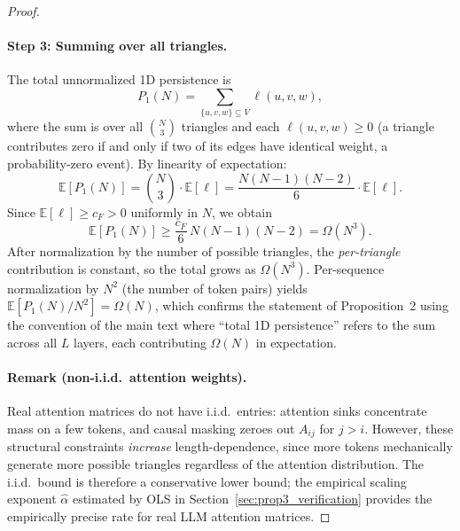 \begin{proof}
\paragraph{Step 3: Summing over all triangles.}
The total unnormalized 1D persistence is
\[
    P_1(N) = \sum_{\{u,v,w\} \subseteq V} \ell(u,v,w),
\]
where the sum is over all $\binom{N}{3}$ triangles and each $\ell(u,v,w) \ge 0$ (a triangle
contributes zero if and only if two of its edges have identical weight, a probability-zero event).
By linearity of expectation:
\[
    \mathbb{E}[P_1(N)] = \binom{N}{3} \cdot \mathbb{E}[\ell]
    = \frac{N(N-1)(N-2)}{6} \cdot \mathbb{E}[\ell].
\]
Since $\mathbb{E}[\ell] \ge c_F > 0$ uniformly in $N$, we obtain
\[
    \mathbb{E}[P_1(N)] \ge \frac{c_F}{6} \, N(N-1)(N-2) = \Omega(N^3).
\]
After normalization by the number of possible triangles, the \emph{per-triangle} contribution is
constant, so the total grows as $\Omega(N^3)$.  Per-sequence normalization by $N^2$ (the number
of token pairs) yields $\mathbb{E}[P_1(N)/N^2] = \Omega(N)$, which confirms the statement of
Proposition~2 using the convention of the main text where ``total 1D persistence'' refers to the
sum across all $L$ layers, each contributing $\Omega(N)$ in expectation.

\paragraph{Remark (non-i.i.d.\ attention weights).}
Real attention matrices do not have i.i.d.\ entries: attention sinks concentrate mass on a few
tokens, and causal masking zeroes out $A_{ij}$ for $j > i$.  However, these structural constraints
\emph{increase} length-dependence, since more tokens mechanically generate more possible triangles
regardless of the attention distribution.  The i.i.d.\ bound is therefore a conservative lower bound;
the empirical scaling exponent $\hat{\alpha}$ estimated by OLS in Section~\ref{sec:prop3_verification}
provides the empirically precise rate for real LLM attention matrices.
\end{proof}
